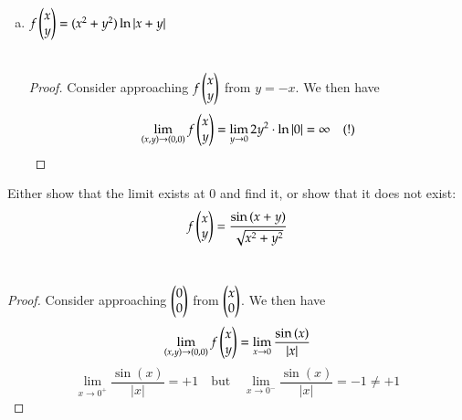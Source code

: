\begin{enumerate}[a.]
  \item $f\begin{pmatrix} x \\ y \end{pmatrix} = (x^2 + y^2) \ln{|x+y|}$ \\
   \\
  \begin{proof}
    Consider approaching $f\begin{pmatrix} x \\ y \end{pmatrix}$ from $y = -x$. We then have
    \[\lim_{(x,y)\rightarrow (0,0)}f\begin{pmatrix} x \\ y \end{pmatrix} = \lim_{y\rightarrow 0} 2y^2\cdot \ln{|0|} = \infty \quad (!)\]
  \end{proof}
  \end{enumerate}

 Either show that the limit exists at $0$ and find it, or show that it does not exist:
\[f\begin{pmatrix} x \\ y \end{pmatrix} = \frac{\sin{(x+y)}}{\sqrt{x^2+y^2}}\]
 \\
\begin{proof}
  Consider approaching $\begin{pmatrix} 0 \\ 0 \end{pmatrix}$ from $\begin{pmatrix} x \\ 0 \end{pmatrix}$. We then have
  \[\lim_{(x,y)\rightarrow (0,0)}f\begin{pmatrix} x \\ y \end{pmatrix} = \lim_{x\rightarrow 0} \frac{\sin{(x)}}{|x|}\]
  \[\lim_{x\rightarrow 0^+} \frac{\sin{(x)}}{|x|} = +1 \quad \text{but} \quad \lim_{x\rightarrow 0^-} \frac{\sin{(x)}}{|x|} = -1 \neq +1\]
  \end{proof}